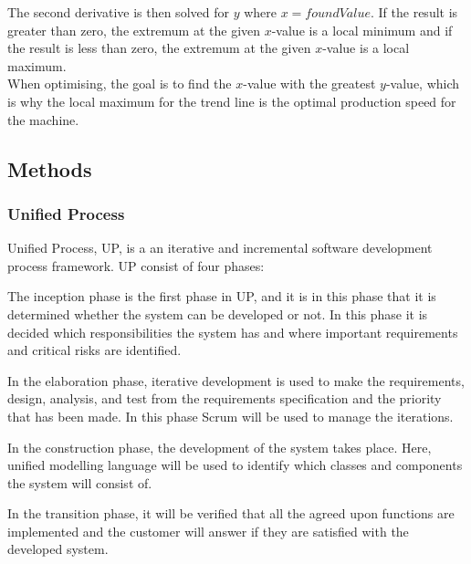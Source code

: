 The second derivative is then solved for \(y\) where \(x = found Value\). If the
result is greater than zero, the extremum at the given \(x\)-value is a local
minimum and if the result is less than zero, the extremum at the given 
\(x\)-value is a local maximum.\\ 

When optimising, the goal is to find the \(x\)-value with the greatest
\(y\)-value, which is why the local maximum for the trend line is the optimal
production speed for the machine.


\subsection{Methods}
\subsubsection{Unified Process}
Unified Process, UP, is a an iterative and incremental software development
process framework. UP consist of four phases:

The inception phase is the first phase in UP, and it is in this phase that it
is determined whether the system can be developed or not. In this phase it is
decided which responsibilities the system has and where important requirements
and critical risks are identified. 

In the elaboration phase, iterative development is used to make the requirements,
design, analysis, and test from the requirements specification and the priority
that has been made. In this phase Scrum will be used to manage the iterations.

In the construction phase, the development of the system takes place. Here, 
unified modelling language will be used to identify which classes and components
the system will consist of. 

In the transition phase, it will be verified that all the agreed upon
functions are implemented and the customer will answer if they are satisfied
with the developed system.


